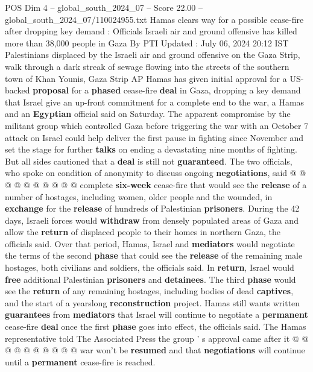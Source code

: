 \begin{textsample}{POS Dim 4 – global\_south\_2024\_07 – Score 22.00 – global\_south\_2024\_07/110024955.txt}  \label{ex:f4_pos_118}
Hamas clears way for a possible cease-fire after dropping key demand : Officials Israeli air and ground offensive has killed more than 38,000 people in Gaza By PTI Updated : July 06, 2024 20:12 IST Palestinians displaced by the Israeli air and ground offensive on the Gaza Strip, walk through a dark streak of sewage flowing into the streets of the southern town of Khan Younis, Gaza Strip AP Hamas has given initial approval for a US-backed \textbf{proposal} for a \textbf{phased} cease-fire \textbf{deal} in Gaza, dropping a key demand that Israel give an up-front commitment for a complete end to the war, a Hamas and an \textbf{Egyptian} official said on Saturday.
The apparent compromise by the militant group which controlled Gaza before triggering the war with an October 7 attack on Israel could help deliver the first pause in fighting since November and set the stage for further \textbf{talks} on ending a devastating nine months of fighting.
But all sides cautioned that a \textbf{deal} is still not \textbf{guaranteed}.
The two officials, who spoke on condition of anonymity to discuss ongoing \textbf{negotiations}, said @ @ @ @ @ @ @ @ @ @ complete \textbf{six-week} cease-fire that would see the \textbf{release} of a number of hostages, including women, older people and the wounded, in \textbf{exchange} for the \textbf{release} of hundreds of Palestinian \textbf{prisoners}.
During the 42 days, Israeli forces would \textbf{withdraw} from densely populated areas of Gaza and allow the \textbf{return} of displaced people to their homes in northern Gaza, the officials said.
Over that period, Hamas, Israel and \textbf{mediators} would negotiate the terms of the second \textbf{phase} that could see the \textbf{release} of the remaining male hostages, both civilians and soldiers, the officials said.
In \textbf{return}, Israel would \textbf{free} additional Palestinian \textbf{prisoners} and \textbf{detainees}.
The third \textbf{phase} would see the \textbf{return} of any remaining hostages, including bodies of dead \textbf{captives}, and the start of a yearslong \textbf{reconstruction} project.
Hamas still wants written \textbf{guarantees} from \textbf{mediators} that Israel will continue to negotiate a \textbf{permanent} cease-fire \textbf{deal} once the first \textbf{phase} goes into effect, the officials said.
The Hamas representative told The Associated Press the group ' s approval came after it @ @ @ @ @ @ @ @ @ @ war won't be \textbf{resumed} and that \textbf{negotiations} will continue until a \textbf{permanent} cease-fire is reached.

\end{textsample}
